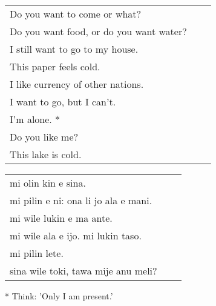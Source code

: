 \begin{supertabular}{p{5,5cm}|ll}
    Do you want to come or what?            \\ %
    Do you want food, or do you want water? \\ %
    I still want to go to my house.         \\ %
    This paper feels cold.                  \\ %
    I like currency of other nations.       \\  %
    I want to go, but I can't.              \\ %
    I'm alone. *                            \\ %
    Do you like me?    &  &                 \\ %
    This lake is cold. &  &                 \\ %
\end{supertabular}

\begin{supertabular}{p{5,5cm}|ll}
    mi olin kin e sina.                  \\ %
    mi pilin e ni: ona li jo ala e mani. \\ %
    mi wile lukin e ma ante.             \\ %
    mi wile ala e ijo. mi lukin taso.    \\ %
    mi pilin lete.                       \\ %
    sina wile toki, tawa mije anu meli?  \\ %
\end{supertabular}

* Think: 'Only I am present.'
%
